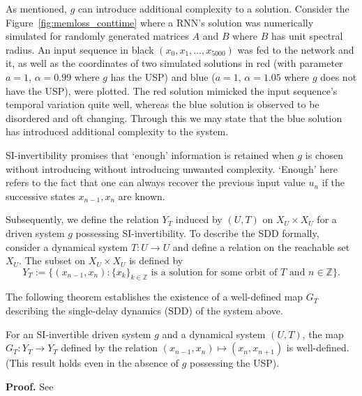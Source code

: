 As mentioned, $g$ can introduce additional complexity to a solution. Consider the Figure~\ref{fig:memloss_conttime} where a RNN's solution was numerically simulated for randomly generated matrices $A$ and $B$ where $B$ has unit spectral radius.
An input sequence in black $(x_0,x_1,\ldots,x_{5000})$ was fed to the network and it, as well as the coordinates of two simulated solutions in red (with parameter $a=1$, $\alpha=0.99$ where $g$ has the USP) and blue ($a=1$, $\alpha=1.05$ where $g$ does not have the USP), were plotted.
The red solution mimicked the input sequence's temporal variation quite well, whereas the blue solution is observed to be disordered and oft changing. Through this we may state that the blue solution has introduced additional complexity to the system. 

SI-invertibility promises that `enough' information is retained when $g$ is chosen without introducing without introducing unwanted complexity. 
`Enough' here refers to the fact that one can always recover the previous input value $u_n$ if the successive states $x_{n-1}, x_n$ are known.

Subsequently, we define the relation $Y_T$ induced by $(U,T)$ on $X_U\times{X_U}$ for a driven system $g$ possessing SI-invertibility.  
To describe the  SDD formally, consider a dynamical system $T: U \to U$ and define a relation on the reachable set $X_U$. The subset on $X_U \times X_U$  is defined by 
\begin{equation}
  Y_T:=\{(x_{n-1},x_n): {\{x_k\}}_{k\in \mathbb{Z}} \mbox{ is a solution for some orbit of } T \mbox{ and } n \in \mathbb{Z}\}.  
\end{equation}

The following theorem establishes the existence of a well-defined map $G_T$ describing the single-delay dynamics (SDD) of the system above. 

\begin{Theorem}\label{Thm_GT_Exists}
  For an SI-invertible driven system $g$ and a dynamical system $(U,T)$, the map $G_T: Y_T \to Y_T$ defined by the relation $(x_{n-1},x_n) \mapsto (x_n,x_{n+1})$ is well-defined. 
  (This result holds even in the absence of $g$ possessing the USP). 
  \end{Theorem}
  \vspace{-6mm}
  {\bf Proof.} See~\cite[Theorem.3]{Supp}

